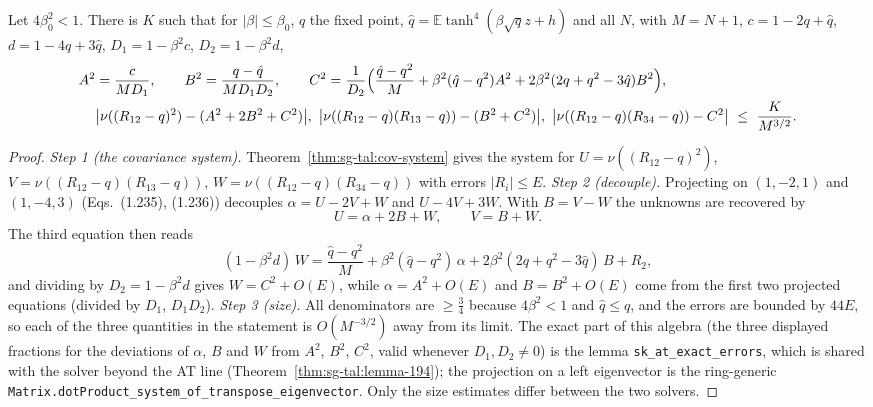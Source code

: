 \begin{theorem}[Theorem~1.8.12, Eq.~(1.265)]
\label{thm:sg-tal:thm-1812}
  \leanok
{}
Let $4\beta_0^2<1$.  There is $K$ such that for $|\beta|\le\beta_0$, $q$ the fixed point, $\hat q=\mathbb E\tanh^4(\beta\sqrt q z+h)$ and all $N$, with $M=N+1$, $c=1-2q+\hat q$, $d=1-4q+3\hat q$, $D_1=1-\beta^2c$, $D_2=1-\beta^2d$,
\begin{align*}
A^2&=\frac{c}{MD_1},\qquad B^2=\frac{q-\hat q}{MD_1D_2},\qquad
C^2=\frac1{D_2}\Bigl(\frac{\hat q-q^2}{M}+\beta^2(\hat q-q^2)A^2+2\beta^2(2q+q^2-3\hat q)B^2\Bigr),\\
&\bigl|\nu((R_{12}-q)^2)-(A^2+2B^2+C^2)\bigr|,\ \bigl|\nu((R_{12}-q)(R_{13}-q))-(B^2+C^2)\bigr|,\ \bigl|\nu((R_{12}-q)(R_{34}-q))-C^2\bigr|\ \le\ \frac K{M^{3/2}}.
\end{align*}
\end{theorem}
\begin{proof}
  \leanok
\emph{Step 1 (the covariance system).} Theorem~\ref{thm:sg-tal:cov-system} gives the system for $U=\nu((R_{12}-q)^2)$, $V=\nu((R_{12}-q)(R_{13}-q))$, $W=\nu((R_{12}-q)(R_{34}-q))$ with errors $|R_i|\le E$.
\emph{Step 2 (decouple).} Projecting on $(1,-2,1)$ and $(1,-4,3)$ (Eqs.~(1.235), (1.236)) decouples $\alpha=U-2V+W$ and $U-4V+3W$. With $B=V-W$ the unknowns are recovered by
\[
U=\alpha+2B+W,\qquad V=B+W .
\]
The third equation then reads
\[
(1-\beta^2d)\,W=\frac{\hat q-q^2}M+\beta^2(\hat q-q^2)\,\alpha+2\beta^2(2q+q^2-3\hat q)\,B+R_2 ,
\]
and dividing by $D_2=1-\beta^2d$ gives $W=C^2+O(E)$, while $\alpha=A^2+O(E)$ and $B=B^2+O(E)$ come from the first two projected equations (divided by $D_1$, $D_1D_2$).
\emph{Step 3 (size).} All denominators are $\ge\frac34$ because $4\beta^2<1$ and $\hat q\le q$, and the errors are bounded by $44E$, so each of the three quantities in the statement is $O(M^{-3/2})$ away from its limit.
The exact part of this algebra (the three displayed fractions for the deviations of $\alpha$, $B$ and $W$ from $A^2$, $B^2$, $C^2$, valid whenever $D_1,D_2\ne0$) is the lemma \texttt{sk\_at\_exact\_errors}, which is shared with the solver beyond the AT line (Theorem~\ref{thm:sg-tal:lemma-194}); the projection on a left eigenvector is the ring-generic \texttt{Matrix.dotProduct\_system\_of\_transpose\_eigenvector}.  Only the size estimates differ between the two solvers.
\end{proof}

